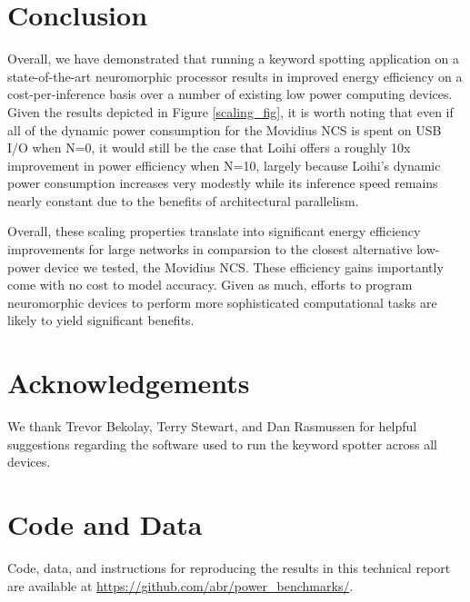 \documentclass{article}
\begin{document}
\section{Conclusion}

Overall, we have demonstrated that running a keyword spotting application on a state-of-the-art neuromorphic processor results in improved energy efficiency on a cost-per-inference basis over a number of existing low power computing devices. Given the results depicted in Figure \ref{scaling_fig}, it is worth noting that even if all of the dynamic power consumption for the Movidius NCS is spent on USB I/O when N=0, it would still be the case that Loihi offers a roughly 10x improvement in power efficiency when N=10, largely because Loihi's dynamic power consumption increases very modestly while its inference speed remains nearly constant due to the benefits of architectural parallelism. 

Overall, these scaling properties translate into significant energy efficiency improvements for large networks in comparsion to the closest alternative low-power device we tested, the Movidius NCS. These efficiency gains importantly come with no cost to model accuracy. Given as much, efforts to program neuromorphic devices to perform more sophisticated computational tasks are likely to yield significant benefits. 

\section*{Acknowledgements}

We thank Trevor Bekolay, Terry Stewart, and Dan Rasmussen for helpful suggestions regarding the software used to run the keyword spotter across all devices.

\section*{Code and Data} 
 
Code, data, and instructions for reproducing the results in this technical report are available at \url{https://github.com/abr/power\_benchmarks/}.



\end{document}
